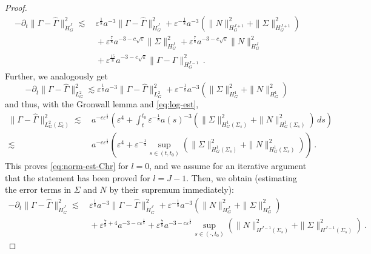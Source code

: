 \documentclass[11pt,leqno,textwidth=10cm]{amsart}
\numberwithin{equation}{section}
\theoremstyle{definition}
\theoremstyle{plain}
\newcommand{\1}{\mathbbm{1}}
\renewcommand{\epsilon}{\varepsilon}
\newcommand{\del}{\partial}
\newcommand{\Gamhat}{\hat{\Gamma}}
\begin{document}
\begin{proof}
\begin{align*}
-\del_t\|\Gamma-\Gamhat\|_{\dot{H}^J_G}^2%
\lesssim&\,\epsilon^\frac18 a^{-3}\|\Gamma-\Gamhat\|_{\dot{H}^{J}_G}^2+\epsilon^{-\frac18}a^{-3}\left(\|N\|_{H^{J+1}_G}^2+\|\Sigma\|_{H^{J+1}_G}^2\right)\\
&\,+\epsilon^\frac{7}8a^{-3-c\sqrt{\epsilon}}\|\Sigma\|_{H^{J}_G}^2+\epsilon^\frac78a^{-3-c\sqrt{\epsilon}}\|N\|_{H^J_G}^2\\
&\,+\epsilon^\frac{15}8a^{-3-c\sqrt{\epsilon}}\|\Gamma-\Gamhat\|_{H^{J-1}_G}^2\,.
\end{align*}
Further, we analogously get
\begin{equation*}
-\del_t\|\Gamma-\Gamhat\|_{L^2_G}^2\lesssim\epsilon^\frac18a^{-3}\|\Gamma-\Gamhat\|_{L^2_G}^2+\epsilon^{-\frac18}a^{-3}\left(\|\Sigma\|_{H^1_G}^2+\|N\|_{H^1_G}^2\right)\,
\end{equation*}
and thus, with the Gronwall lemma and \eqref{eq:log-est}, 
\begin{align*}
\|\Gamma-\Gamhat\|_{L^2_G(\Sigma_t)}^2\lesssim&\,a^{-c\epsilon^\frac18}\left(\epsilon^4+\int_t^{t_0}\epsilon^{-\frac18}a(s)^{-3}\left(\|\Sigma\|_{H^1_G(\Sigma_s)}^2+\|N\|^2_{H^1_G(\Sigma_s)}\right)\,ds\right)\\
\lesssim&\,a^{-c\epsilon^{\frac18}}\left(\epsilon^4+\epsilon^{-\frac14}\sup_{s\in(t,t_0)}\left(\|\Sigma\|_{H^1_G(\Sigma_s)}^2+\|N\|^2_{H^1_G(\Sigma_s)}\right)\right)\,.
\end{align*}
This proves \eqref{eq:norm-est-Chr} for $l=0$, and we assume for an iterative argument that the statement has been proved for $l=J-1$. Then, we obtain (estimating the error terms in $\Sigma$ and $N$ by their supremum immediately):
\begin{align*}
-\del_t\|\Gamma-\Gamhat\|_{\dot{H}^J_G}^2\lesssim&\,\epsilon^\frac18a^{-3}\|\Gamma-\Gamhat\|_{\dot{H}^J_G}^2+\epsilon^{-\frac18}a^{-3}\left(\|N\|_{H^J_G}^2+\|\Sigma\|_{H^J_G}^2\right)\\
&\,+\epsilon^{\frac{7}8+4}a^{-3-c\epsilon^\frac18}+\epsilon^\frac{7}8a^{-3-c\epsilon^\frac18}\sup_{s\in(\cdot,t_0)}\left(\|N\|_{H^{J-1}(\Sigma_s)}^2+\|\Sigma\|_{H^{J-1}(\Sigma_s)}^2\right)\,.

\end{align*}
\end{proof}
\end{document}
